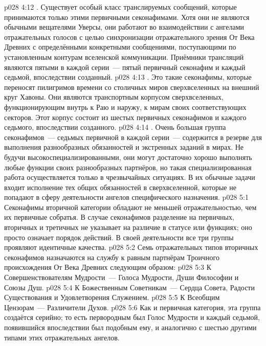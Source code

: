\vs p028 4:12 . Существует особый класс транслируемых сообщений, которые принимаются только этими первичными секонафимами. Хотя они не являются обычными вещателями Уверсы, они работают во взаимодействии с ангелами отражательных голосов с целью синхронизации отражательного зрения От Века Древних с определёнными конкретными сообщениями, поступающими по установленным контурам вселенской коммуникации. Приёмники трансляций являются пятыми в каждой серии~--- пятый первичный секонафим и каждый седьмой, впоследствии созданный.
\vs p028 4:13 . Это такие секонафимы, которые переносят пилигримов времени со столичных миров сверхвселенных на внешний круг Хавоны. Они являются транспортным корпусом сверхвселенных, функционирующим внутрь к Раю и наружу, к мирам своих соответствующих секторов. Этот корпус состоит из шестых первичных секонафимов и каждого седьмого, впоследствии созданного.
\vs p028 4:14 . Очень большая группа секонафимов~--- седьмых первичной в каждой серии~--- содержится в резерве для выполнения разнообразных обязанностей и экстренных заданий в мирах. Не будучи высокоспециализированными, они могут достаточно хорошо выполнять любые функции своих разнообразных партнёров, но такая специализированная работа осуществляется только в чрезвычайных ситуациях. В их обычные задачи входит исполнение тех общих обязанностей в сверхвселенной, которые не попадают в сферу деятельности ангелов специфического назначения.
\vs p028 5:1 Секонафимы вторичной категории обладают не меньшей отражательностью, чем их первичные собратья. В случае секонафимов разделение на первичных, вторичных и третичных не указывает на различие в статусе или функциях; оно просто означает порядок действий. В своей деятельности все три группы проявляют идентичные качества.
\vs p028 5:2 \pc Семь отражательных типов вторичных секонафимов назначаются на службу к равным партнёрам Троичного происхождения От Века Древних следующим образом:
\vs p028 5:3 К Совершенствователям Мудрости~--- Голоса Мудрости, Души Философии и Союзы Душ.
\vs p028 5:4 К Божественным Советникам~--- Сердца Совета, Радости Существования и Удовлетворения Служением.
\vs p028 5:5 К Всеобщим Цензорам~--- Различители Духов.
\vs p028 5:6 \pc Как и первичная категория, эта группа создаётся серийно; то есть первородным был Голос Мудрости и каждый седьмой, появившийся впоследствии был подобным ему, и аналогично с шестью другими типами этих отражательных ангелов.
